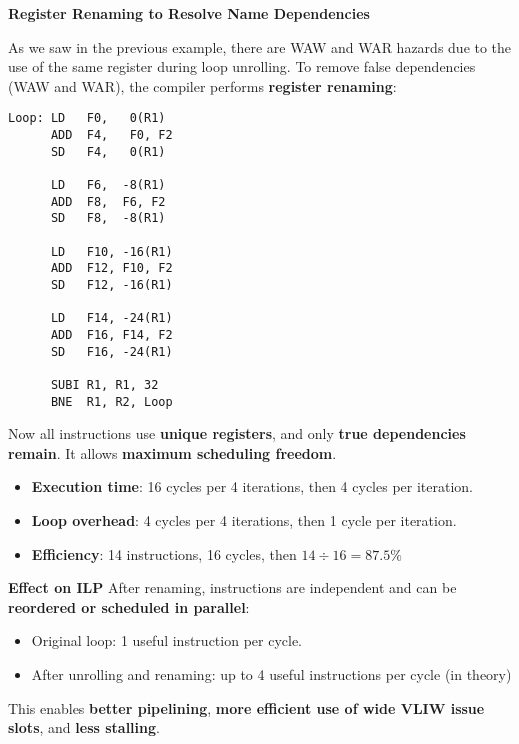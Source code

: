 \begin{flushleft}
    \textcolor{Green3}{ \textbf{Register Renaming to Resolve Name Dependencies}}
\end{flushleft}
As we saw in the previous example, there are WAW and WAR hazards due to the use of the same register during loop unrolling. To remove false dependencies (WAW and WAR), the compiler performs \textbf{register renaming}:
\begin{lstlisting}[language=riscv]
Loop: LD   F0,   0(R1)
      ADD  F4,   F0, F2
      SD   F4,   0(R1)

      LD   F6,  -8(R1)
      ADD  F8,  F6, F2
      SD   F8,  -8(R1)

      LD   F10, -16(R1)
      ADD  F12, F10, F2
      SD   F12, -16(R1)

      LD   F14, -24(R1)
      ADD  F16, F14, F2
      SD   F16, -24(R1)

      SUBI R1, R1, 32
      BNE  R1, R2, Loop
\end{lstlisting}
Now all instructions use \textbf{unique registers}, and only \textbf{true dependencies remain}. It allows \textbf{maximum scheduling freedom}.
\begin{itemize}
    \item \textbf{Execution time}: 16 cycles per 4 iterations, then 4 cycles per iteration.
    \item \textbf{Loop overhead}: 4 cycles per 4 iterations, then 1 cycle per iteration.
    \item \textbf{Efficiency}: 14 instructions, 16 cycles, then $14 \div 16 = 87.5\%$
\end{itemize}

\highspace
\textcolor{Green3}{\faIcon{\speedIcon} \textbf{Effect on ILP}} After renaming, instructions are independent and can be \textbf{reordered or scheduled in parallel}:
\begin{itemize}
    \item Original loop: 1 useful instruction per cycle.
    \item After unrolling and renaming: up to 4 useful instructions per cycle (in theory)
\end{itemize}
This enables \textbf{better pipelining}, \textbf{more efficient use of wide VLIW issue slots}, and \textbf{less stalling}.

